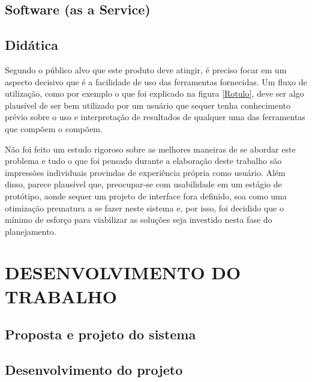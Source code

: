 \documentclass{abnt}
\begin{document}
\section{Software (as a Service)}


\section{Didática}

Segundo o público alvo que este produto deve atingir, é preciso focar em um
aspecto decisivo que é a facilidade de uso das ferramentas fornecidas. Um fluxo
de utilização, como por exemplo o que foi explicado na figura \ref{Rotulo}, deve
ser algo plausível de ser bem utilizado por um usuário que sequer tenha
conhecimento prévio sobre o uso e interpretação de resultados de qualquer uma
das ferramentas que compõem o compõem.

Não foi feito um estudo rigoroso sobre as melhores maneiras de se abordar este
problema e tudo o que foi pensado durante a elaboração deste trabalho são
impressões individuais provindas de experiência própria como usuário. Além
disso, parece plausível que, preocupar-se com usabilidade em um estágio de
protótipo, aonde sequer um projeto de interface fora definido, soa como uma
otimização prematura a se fazer neste sistema e, por isso, foi decidido que o
mínimo de esforço para viabilizar as soluções seja investido nesta fase do
planejamento.

\chapter{DESENVOLVIMENTO DO TRABALHO}

\section{Proposta e projeto do sistema}


\section{Desenvolvimento do projeto}

\end{document}
